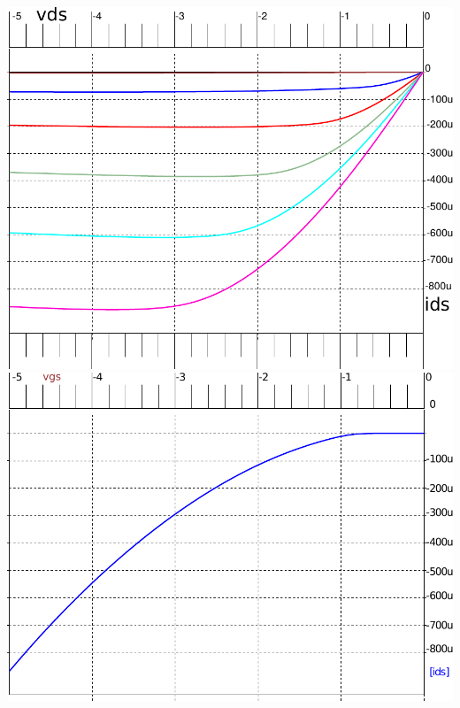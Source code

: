 \includegraphics[scale=0.8]{images/pmos_vgs_param}
\includegraphics[scale=0.8]{images/pmos_vds_vgs}



